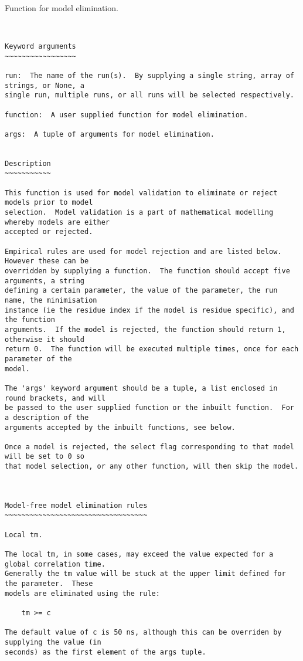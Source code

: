 Function for model elimination.
\scriptsize
\begin{verbatim}


Keyword arguments
~~~~~~~~~~~~~~~~~

run:  The name of the run(s).  By supplying a single string, array of strings, or None, a
single run, multiple runs, or all runs will be selected respectively.

function:  A user supplied function for model elimination.

args:  A tuple of arguments for model elimination.


Description
~~~~~~~~~~~

This function is used for model validation to eliminate or reject models prior to model
selection.  Model validation is a part of mathematical modelling whereby models are either
accepted or rejected.

Empirical rules are used for model rejection and are listed below.  However these can be
overridden by supplying a function.  The function should accept five arguments, a string
defining a certain parameter, the value of the parameter, the run name, the minimisation
instance (ie the residue index if the model is residue specific), and the function
arguments.  If the model is rejected, the function should return 1, otherwise it should
return 0.  The function will be executed multiple times, once for each parameter of the
model.

The 'args' keyword argument should be a tuple, a list enclosed in round brackets, and will
be passed to the user supplied function or the inbuilt function.  For a description of the
arguments accepted by the inbuilt functions, see below.

Once a model is rejected, the select flag corresponding to that model will be set to 0 so
that model selection, or any other function, will then skip the model.



Model-free model elimination rules
~~~~~~~~~~~~~~~~~~~~~~~~~~~~~~~~~~

Local tm.

The local tm, in some cases, may exceed the value expected for a global correlation time.
Generally the tm value will be stuck at the upper limit defined for the parameter.  These
models are eliminated using the rule:

    tm >= c

The default value of c is 50 ns, although this can be overriden by supplying the value (in
seconds) as the first element of the args tuple.



\end{verbatim}
